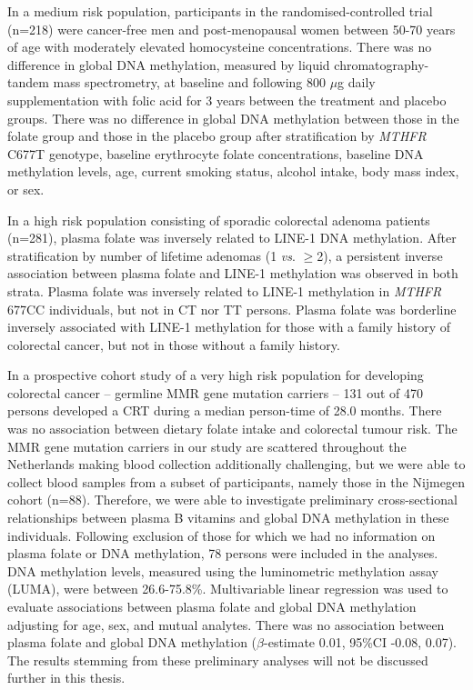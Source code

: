 \noindent In a medium risk population, participants in the randomised-controlled trial (n=218) were cancer-free men and post-menopausal women between 50-70 years of age with moderately elevated homocysteine concentrations. There was no difference in global DNA methylation, measured by liquid chromatography-tandem mass spectrometry, at baseline and following 800 $\mu$g daily supplementation with folic acid for 3 years between the treatment and placebo groups. There was no difference in global DNA methylation between those in the folate group and those in the placebo group after stratification by \emph{MTHFR} C677T genotype, baseline erythrocyte folate concentrations, baseline DNA methylation levels, age, current smoking status, alcohol intake, body mass index, or sex.

\noindent In a high risk population consisting of sporadic colorectal adenoma patients (n=281), plasma folate was inversely related to LINE-1 DNA methylation. After stratification by number of lifetime adenomas (1 \emph{vs}. $\geq$2), a persistent inverse association between plasma folate and LINE-1 methylation was observed in both strata. Plasma folate was inversely related to LINE-1 methylation in \emph{MTHFR} 677CC individuals, but not in CT nor TT persons. Plasma folate was borderline inversely associated with LINE-1 methylation for those with a family history of colorectal cancer, but not in those without a family history.

\noindent In a prospective cohort study of a very high risk population for developing colorectal cancer -- germline MMR gene mutation carriers -- 131 out of 470 persons developed a CRT during a median person-time of 28.0 months. There was no association between dietary folate intake and colorectal tumour risk. The MMR gene mutation carriers in our study are scattered throughout the Netherlands making blood collection additionally challenging, but we were able to collect blood samples from a subset of participants, namely those in the Nijmegen cohort (n=88). Therefore, we were able to investigate preliminary cross-sectional relationships between plasma B vitamins and global DNA methylation in these individuals. Following exclusion of those for which we had no information on plasma folate or DNA methylation, 78 persons were included in the analyses. DNA methylation levels, measured using the luminometric methylation assay (LUMA), were between 26.6-75.8\%. Multivariable linear regression was used to evaluate associations between plasma folate and global DNA methylation adjusting for age, sex, and mutual analytes. There was no association between plasma folate and global DNA methylation ($\beta$-estimate 0.01, 95\%CI -0.08, 0.07). The results stemming from these preliminary analyses will not be discussed further in this thesis.


